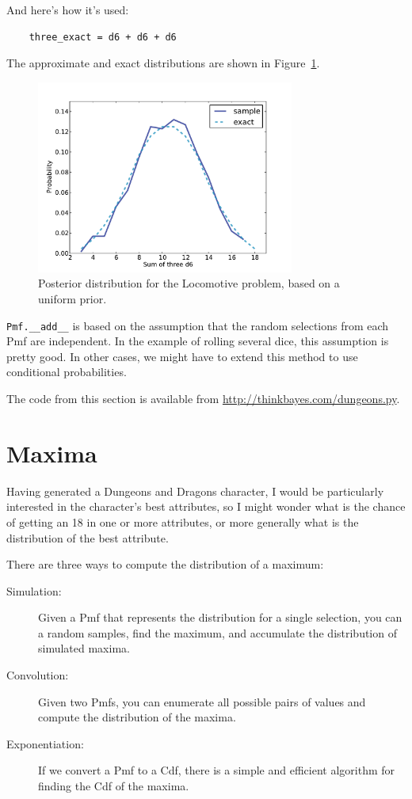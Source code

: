 \documentclass[12pt]{book}
\begin{document}
And here's how it's used:

\begin{verbatim}
    three_exact = d6 + d6 + d6
\end{verbatim}

The approximate and exact distributions are shown in
Figure~\ref{fig.dungeons1}.

\begin{figure}
\centerline{\includegraphics[height=2.5in]{figs/dungeons1.pdf}}
\caption{Posterior distribution for the Locomotive problem, based
on a uniform prior.}
\label{fig.dungeons1}
\end{figure}

\verb"Pmf.__add__" is based on the assumption that the random
selections from each Pmf are independent.  In the example of rolling
several dice, this assumption is pretty good.  In other cases, we
might have to extend this method to use conditional probabilities.

The code from this section is available from
\url{http://thinkbayes.com/dungeons.py}.


\section{Maxima}

Having generated a Dungeons and Dragons character, I would be
particularly interested in the character's best attributes, so
I might wonder what is the chance of getting an 18 in one or
more attributes, or more generally what is the
distribution of the best attribute.

There are three ways to compute the distribution of a maximum:

\begin{description}

\item[Simulation:] Given a Pmf that represents the distribution
for a single selection, you can a random samples, find the maximum,
and accumulate the distribution of simulated maxima.

\item[Convolution:] Given two Pmfs, you can enumerate all possible
pairs of values and compute the distribution of the maxima.

\item[Exponentiation:] If we convert a Pmf to a Cdf, there is a simple
and efficient algorithm for finding the Cdf of the maxima.

\end{description}
\end{document}
